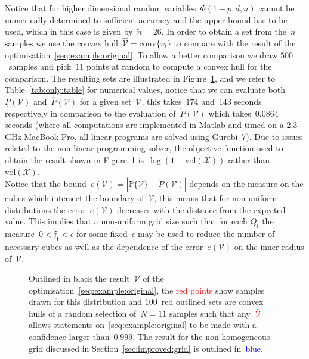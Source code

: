 \documentclass[letterpaper, 10pt, conference]{ieeeconf} %
\providecommand{\abs}[1]{\left\lvert#1\right\rvert}
\providecommand{\conv}{\text{conv}}
\providecommand{\bfa}[1]{\mathbf{#1}}
\begin{document}
%
Notice that for higher dimensional random variables~$\Phi(1-p,d,n)$ cannot be numerically determined to sufficient accuracy and the upper bound has to be used, which in this case is given by~$\tilde n=26$.
%
In order to obtain a set from the~$n$ samples we use the convex hull~$\hat{\mathcal V}=\conv\{v_i\}$ to compare with the result of the optimisation~\eqref{seq:example:original}.
%
To allow a better comparison we draw $500$~samples and pick~$11$ points at random to compute a convex hull for the comparison.
%
The resulting sets are illustrated in Figure~\ref{fig:example:in:comparison}, and we refer to Table~\ref{tab:only:table} for numerical values, notice that we can evaluate both~$\underline{P}(\mathcal V)$ and~$\overline{P}(\mathcal V)$ for a given set~$\mathcal V$, this takes~$174$ and~$143$ seconds respectively in comparison to the evaluation of~$\mathring{P}(\mathcal V)$ which takes~$0.0864$ seconds (where all computations are implemented in Matlab and timed on a 2.3 GHz MacBook Pro, all linear programs are solved using Gurobi~7).
%
Due to issues related to the non-linear programming solver, the objective function used to obtain the result shown in Figure~\ref{fig:example:in:comparison} is~$\log(1+\text{vol}(\mathcal X))$ rather than~$\text{vol}(\mathcal X)$.
%
\\[1em]
%
Notice that the bound~$e(\mathcal V) = \abs{\mathbb P\{\mathcal V\}-\mathring{P}(\mathcal V)}$ depends on the measure on the cubes which intersect the boundary of~$\mathcal V$, this means that for non-uniform distributions the error~$e(\mathcal V)$ decreases with the distance from the expected value.
%
This implies that a non-uniform grid size such that for each $Q_\bfa{i}$ the measure~$0<\mathfrak{f}_\bfa{i}<\epsilon$ for some fixed~$\epsilon$ may be used to reduce the number of necessary cubes as well as the dependence of the error~$e(\mathcal V)$ on the inner radius of~$\mathcal V$.

\begin{figure}\centering

\caption{Outlined in black the result~$\mathcal V$ of the optimisation~\eqref{seq:example:original}, the \textcolor{red}{red points} show samples drawn for this distribution and $100$~red outlined sets are convex hulls of a random selection of~$N=11$ samples such that any~$\textcolor{red}{\hat{\mathcal V}}$ allows statements on~\eqref{seq:example:original} to be made with a confidence larger than~$0.999$.
%
The result for the non-homogeneous grid discussed in Section~\ref{sec:improved:grid} is outlined in~\textcolor{blue}{blue}.}
\label{fig:example:in:comparison}
\end{figure}
%
%
%
\end{document}
